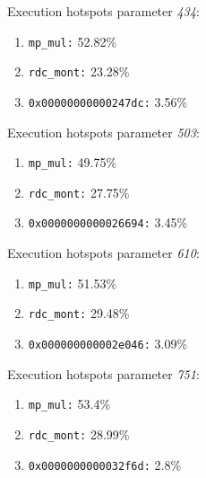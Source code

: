 Execution hotspots parameter \textit{434}:
\begin{enumerate}[noitemsep]
	\item \texttt{mp\_mul:} 52.82\%
	\item \texttt{rdc\_mont:} 23.28\%
	\item \texttt{0x00000000000247dc:} 3.56\%
\end{enumerate}
Execution hotspots parameter \textit{503}:
\begin{enumerate}[noitemsep]
	\item \texttt{mp\_mul:} 49.75\%
	\item \texttt{rdc\_mont:} 27.75\%
	\item \texttt{0x0000000000026694:} 3.45\%
\end{enumerate}
Execution hotspots parameter \textit{610}:
\begin{enumerate}[noitemsep]
	\item \texttt{mp\_mul:} 51.53\%
	\item \texttt{rdc\_mont:} 29.48\%
	\item \texttt{0x000000000002e046:} 3.09\%
\end{enumerate}
Execution hotspots parameter \textit{751}:
\begin{enumerate}[noitemsep]
	\item \texttt{mp\_mul:} 53.4\%
	\item \texttt{rdc\_mont:} 28.99\%
	\item \texttt{0x0000000000032f6d:} 2.8\%
\end{enumerate}